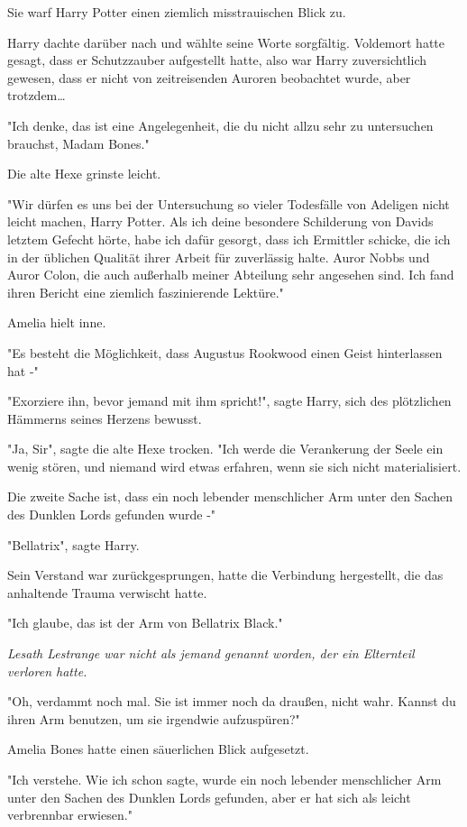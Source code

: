 {Sie warf Harry Potter einen ziemlich misstrauischen Blick zu.

Harry dachte darüber nach und wählte seine Worte sorgfältig. Voldemort hatte gesagt, dass er Schutzzauber aufgestellt hatte, also war Harry zuversichtlich gewesen, dass er nicht von zeitreisenden Auroren beobachtet wurde, aber trotzdem…

"Ich denke, das ist eine Angelegenheit, die du nicht allzu sehr zu untersuchen brauchst, Madam Bones."

Die alte Hexe grinste leicht.

"Wir dürfen es uns bei der Untersuchung so vieler Todesfälle von Adeligen nicht leicht machen, Harry Potter. Als ich deine besondere Schilderung von Davids letztem Gefecht hörte, habe ich dafür gesorgt, dass ich Ermittler schicke, die ich in der üblichen Qualität ihrer Arbeit für zuverlässig halte. Auror Nobbs und Auror Colon, die auch außerhalb meiner Abteilung sehr angesehen sind. Ich fand ihren Bericht eine ziemlich faszinierende Lektüre."

Amelia hielt inne.

"Es besteht die Möglichkeit, dass Augustus Rookwood einen Geist hinterlassen hat -"

"Exorziere ihn, bevor jemand mit ihm spricht!", sagte Harry, sich des plötzlichen Hämmerns seines Herzens bewusst.

"Ja, Sir", sagte die alte Hexe trocken. "Ich werde die Verankerung der Seele ein wenig stören, und niemand wird etwas erfahren, wenn sie sich nicht materialisiert.

Die zweite Sache ist, dass ein noch lebender menschlicher Arm unter den Sachen des Dunklen Lords gefunden wurde -"

"Bellatrix", sagte Harry.

Sein Verstand war zurückgesprungen, hatte die Verbindung hergestellt, die das anhaltende Trauma verwischt hatte.

"Ich glaube, das ist der Arm von Bellatrix Black."

\emph{Lesath Lestrange war nicht als jemand genannt worden, der ein Elternteil verloren hatte.}

"Oh, verdammt noch mal. Sie ist immer noch da draußen, nicht wahr. Kannst du ihren Arm benutzen, um sie irgendwie aufzuspüren?"

Amelia Bones hatte einen säuerlichen Blick aufgesetzt.

"Ich verstehe. Wie ich schon sagte, wurde ein noch lebender menschlicher Arm unter den Sachen des Dunklen Lords gefunden, aber er hat sich als leicht verbrennbar erwiesen."

}
